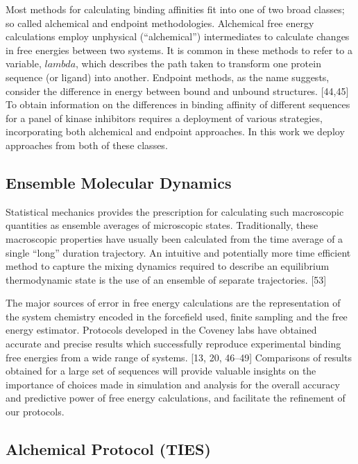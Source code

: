 \documentclass[conference]{IEEEtran}
\begin{document}
Most methods for calculating binding affinities fit into one of two broad classes; so called alchemical and endpoint methodologies. Alchemical free energy calculations employ unphysical (“alchemical”) intermediates to calculate changes in free energies between two systems. It is common in these methods to refer to a variable, $lambda$, which describes the path taken to transform one protein sequence (or ligand) into another. Endpoint methods, as the name suggests, consider the difference in energy between bound and unbound structures. [44,45] To obtain information on the differences in binding affinity of different sequences for a panel of kinase inhibitors requires a deployment of various strategies, incorporating both alchemical and endpoint approaches. In this work we deploy approaches from both of these classes.


\subsection{Ensemble Molecular Dynamics}\label{sec:emd}

Statistical mechanics provides the prescription for calculating such macroscopic quantities as ensemble averages of microscopic states. Traditionally, these macroscopic properties have usually been calculated from the time average of a single “long” duration trajectory. An intuitive and potentially more time efficient method to capture the mixing dynamics required to describe an equilibrium thermodynamic state is the use of an ensemble of separate trajectories. [53]

The major sources of error in free energy calculations are the representation of the system chemistry encoded in the forcefield used, finite sampling and the free energy estimator. Protocols developed in the Coveney labs have obtained accurate and precise results which successfully reproduce experimental binding free energies from a wide range of systems. [13, 20, 46–49] Comparisons of results obtained for a large set of sequences will provide valuable insights on the importance of choices made in simulation and analysis for the overall accuracy and predictive power of free energy calculations, and facilitate the refinement of our protocols. 


\subsection{Alchemical Protocol (TIES)}\label{sec:ties}
\end{document}
